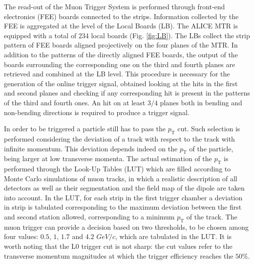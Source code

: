 The read-out of the Muon Trigger System is performed through front-end electronics (FEE) boards connected to the strips.
Information collected by the FEE is aggregated at the level of the Local Boards (LB).
The ALICE MTR is equipped with a total of 234 local boards (Fig. \ref{fig:LB}).
The LBs collect the strip pattern of FEE boards aligned projectively on the four planes of the MTR.
In addition to the patterns of the directly aligned FEE boards, the output of the boards surrounding the corresponding one on the third and fourth planes are retrieved and combined at the LB level.
This procedure is necessary for the generation of the online trigger signal, obtained looking at the hits in the first and second planes and checking if any corresponding hit is present in the patterns of the third and fourth ones.
An hit on at least $3/4$ planes both in bending and non-bending directions is required to produce a trigger signal.

In order to be triggered a particle still has to pass the $p_{\mathrm{T}}$ cut.
Such selection is performed considering the deviation of a track with respect to the track with infinite momentum.
This deviation depends indeed on the $p_{\mathrm{T}}$ of the particle, being larger at low transverse momenta.
The actual estimation of the $p_{\mathrm{T}}$ is performed through the Look-Up Tables (LUT) which are filled according to Monte Carlo simulations of muon tracks, in which a realistic description of all detectors as well as their segmentation and the field map of the dipole are taken into account.
In the LUT, for each strip in the first trigger chamber a deviation in strip is tabulated corresponding to the maximum deviation between the first and second station allowed, corresponding to a minimum $p_{\mathrm{T}}$ of the track.
The muon trigger can provide a decision based on two thresholds, to be chosen among four values: $0.5$, $1$, $1.7$ and $4.2$ $GeV/c$, which are tabulated in the LUT.
It is worth noting that the L0 trigger cut is not sharp: the cut values refer to the transverse momentum magnitudes at which the trigger efficiency reaches the $50\%$. 
